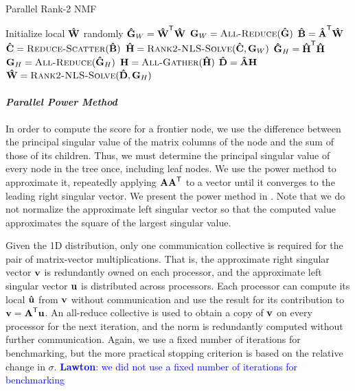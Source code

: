 \documentclass[conference,compsoc]{IEEEtran}
\newcommand{\LM}[1]{\textcolor{blue}{\textbf{Lawton}: #1}}
\begin{document}
\begin{algorithm}
\caption{Parallel Rank-2 NMF}
\label{alg:parrank2nmf}
\begin{algorithmic}[1]
		\State Initialize local $\M[\hat]{W}$ randomly
			\State {}
			\State $\M[\hat]{G}_W = \M[\hat]{W}^\Tra \M[\hat]{W}$
			\State $\M{G}_W = \textsc{All-Reduce}(\M[\hat]{G})$
			\State $\M[\hat]{B} = \M[\hat]{A}^\Tra \M[\hat]{W}$ %
			\State $\M[\hat]{C} = \textsc{Reduce-Scatter}(\M[\hat]{B})$
			\State $\M[\hat]{H} = \textsc{Rank2-NLS-Solve}(\M[\hat]{C},\M{G}_W)$
			\State {}
			\State $\M[\hat]{G}_H = \M[\hat]{H}^\Tra \M[\hat]{H}$
			\State $\M{G}_H = \textsc{All-Reduce}(\M[\hat]{G}_H)$
			\State $\M{H} = \textsc{All-Gather}(\M[\hat]{H})$
			\State $\M[\hat]{D} = \M[\hat]{A} \M{H}$ %
			\State $\M[\hat]{W} = \textsc{Rank2-NLS-Solve}(\M[\hat]{D},\M{G}_H)$
		\EndWhile
	\EndFunction
\end{algorithmic}
\end{algorithm}

\paragraph{\emph{Parallel Power Method}}

In order to compute the score for a frontier node, we use the difference between the principal singular value of the matrix columns of the node and the sum of those of its children.
Thus, we must determine the principal singular value of every node in the tree once, including leaf nodes.
We use the power method to approximate it, repeatedly applying $\M{A}\M{A}^\Tra$ to a vector until it converges to the leading right singular vector.
We present the power method in .
Note that we do not normalize the approximate left singular vector so that the computed value approximates the square of the largest singular value.

Given the 1D distribution, only one communication collective is required for the pair of matrix-vector multiplications.
That is, the approximate right singular vector $\V{v}$ is redundantly owned on each processor, and the approximate left singular vector $\V{u}$ is distributed across processors.
Each processor can compute its local $\V[\hat]{u}$ from $\V{v}$ without communication and use the result for its contribution to $\V{v}=\M{A}^\Tra \V{u}$.
An all-reduce collective is used to obtain a copy of $\V{v}$ on every processor for the next iteration, and the norm is redundantly computed without further communication.
Again, we use a fixed number of iterations for benchmarking, but the more practical stopping criterion is based on the relative change in $\sigma$.
\LM{we did not use a fixed number of iterations for benchmarking}
\end{document}
